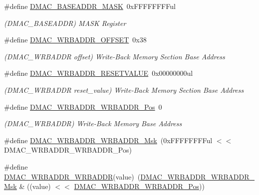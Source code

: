 \begin{DoxyCompactItemize}
\#define \mbox{\hyperlink{group___s_a_m_d21___d_m_a_c_ga127ef226f77026d0823b747ee67bae23}{D\+M\+A\+C\+\_\+\+B\+A\+S\+E\+A\+D\+D\+R\+\_\+\+M\+A\+SK}}~0x\+F\+F\+F\+F\+F\+F\+F\+Ful
\begin{DoxyCompactList}\small\item\em (D\+M\+A\+C\+\_\+\+B\+A\+S\+E\+A\+D\+DR) M\+A\+SK Register \end{DoxyCompactList}\item 
\#define \mbox{\hyperlink{group___s_a_m_d21___d_m_a_c_ga5b6aaec44da69cd41c7d06d89f0efe09}{D\+M\+A\+C\+\_\+\+W\+R\+B\+A\+D\+D\+R\+\_\+\+O\+F\+F\+S\+ET}}~0x38
\begin{DoxyCompactList}\small\item\em (D\+M\+A\+C\+\_\+\+W\+R\+B\+A\+D\+DR offset) Write-\/\+Back Memory Section Base Address \end{DoxyCompactList}\item 
\#define \mbox{\hyperlink{group___s_a_m_d21___d_m_a_c_ga189f4aeb04740867b54f1aa1e6f1ddb8}{D\+M\+A\+C\+\_\+\+W\+R\+B\+A\+D\+D\+R\+\_\+\+R\+E\+S\+E\+T\+V\+A\+L\+UE}}~0x00000000ul
\begin{DoxyCompactList}\small\item\em (D\+M\+A\+C\+\_\+\+W\+R\+B\+A\+D\+DR reset\+\_\+value) Write-\/\+Back Memory Section Base Address \end{DoxyCompactList}\item 
\#define \mbox{\hyperlink{group___s_a_m_d21___d_m_a_c_ga2521a42f3dbcfca0ef2f94888d5f035f}{D\+M\+A\+C\+\_\+\+W\+R\+B\+A\+D\+D\+R\+\_\+\+W\+R\+B\+A\+D\+D\+R\+\_\+\+Pos}}~0
\begin{DoxyCompactList}\small\item\em (D\+M\+A\+C\+\_\+\+W\+R\+B\+A\+D\+DR) Write-\/\+Back Memory Base Address \end{DoxyCompactList}\item 
\#define \mbox{\hyperlink{group___s_a_m_d21___d_m_a_c_gaecf23b7a2a5f594cf8246b5cdc0a24c7}{D\+M\+A\+C\+\_\+\+W\+R\+B\+A\+D\+D\+R\+\_\+\+W\+R\+B\+A\+D\+D\+R\+\_\+\+Msk}}~(0x\+F\+F\+F\+F\+F\+F\+F\+Ful $<$$<$ D\+M\+A\+C\+\_\+\+W\+R\+B\+A\+D\+D\+R\+\_\+\+W\+R\+B\+A\+D\+D\+R\+\_\+\+Pos)
\item 
\#define \mbox{\hyperlink{group___s_a_m_d21___d_m_a_c_ga17e9d8e4994b0926887df47a19878b4e}{D\+M\+A\+C\+\_\+\+W\+R\+B\+A\+D\+D\+R\+\_\+\+W\+R\+B\+A\+D\+DR}}(value)~(\mbox{\hyperlink{group___s_a_m_d21___d_m_a_c_gaecf23b7a2a5f594cf8246b5cdc0a24c7}{D\+M\+A\+C\+\_\+\+W\+R\+B\+A\+D\+D\+R\+\_\+\+W\+R\+B\+A\+D\+D\+R\+\_\+\+Msk}} \& ((value) $<$$<$ \mbox{\hyperlink{group___s_a_m_d21___d_m_a_c_ga2521a42f3dbcfca0ef2f94888d5f035f}{D\+M\+A\+C\+\_\+\+W\+R\+B\+A\+D\+D\+R\+\_\+\+W\+R\+B\+A\+D\+D\+R\+\_\+\+Pos}}))

\end{DoxyCompactItemize}
